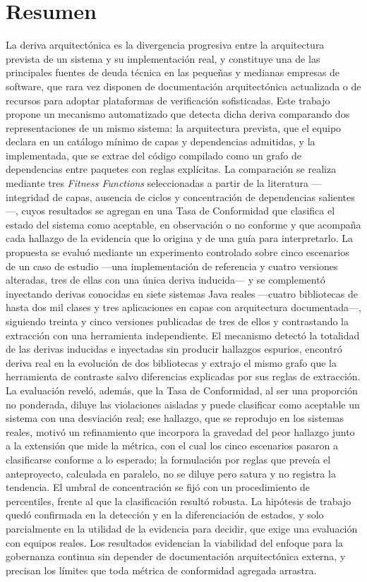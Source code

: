 
\chapter*{Resumen}
La deriva arquitectónica es la divergencia progresiva entre la arquitectura prevista de un sistema y su implementación real, y constituye una de las principales fuentes de deuda técnica en las pequeñas y medianas empresas de software, que rara vez disponen de documentación arquitectónica actualizada o de recursos para adoptar plataformas de verificación sofisticadas. Este trabajo propone un mecanismo automatizado que detecta dicha deriva comparando dos representaciones de un mismo sistema: la arquitectura prevista, que el equipo declara en un catálogo mínimo de capas y dependencias admitidas, y la implementada, que se extrae del código compilado como un grafo de dependencias entre paquetes con reglas explícitas. La comparación se realiza mediante tres \textit{Fitness Functions} seleccionadas a partir de la literatura ---integridad de capas, ausencia de ciclos y concentración de dependencias salientes---, cuyos resultados se agregan en una Tasa de Conformidad que clasifica el estado del sistema como aceptable, en observación o no conforme y que acompaña cada hallazgo de la evidencia que lo origina y de una guía para interpretarlo. La propuesta se evaluó mediante un experimento controlado sobre cinco escenarios de un caso de estudio ---una implementación de referencia y cuatro versiones alteradas, tres de ellas con una única deriva inducida--- y se complementó inyectando derivas conocidas en siete sistemas Java reales ---cuatro bibliotecas de hasta dos mil clases y tres aplicaciones en capas con arquitectura documentada---, siguiendo treinta y cinco versiones publicadas de tres de ellos y contrastando la extracción con una herramienta independiente. El mecanismo detectó la totalidad de las derivas inducidas e inyectadas sin producir hallazgos espurios, encontró deriva real en la evolución de dos bibliotecas y extrajo el mismo grafo que la herramienta de contraste salvo diferencias explicadas por sus reglas de extracción. La evaluación reveló, además, que la Tasa de Conformidad, al ser una proporción no ponderada, diluye las violaciones aisladas y puede clasificar como aceptable un sistema con una desviación real; ese hallazgo, que se reprodujo en los sistemas reales, motivó un refinamiento que incorpora la gravedad del peor hallazgo junto a la extensión que mide la métrica, con el cual los cinco escenarios pasaron a clasificarse conforme a lo esperado; la formulación por reglas que preveía el anteproyecto, calculada en paralelo, no se diluye pero satura y no registra la tendencia. El umbral de concentración se fijó con un procedimiento de percentiles, frente al que la clasificación resultó robusta. La hipótesis de trabajo quedó confirmada en la detección y en la diferenciación de estados, y solo parcialmente en la utilidad de la evidencia para decidir, que exige una evaluación con equipos reales. Los resultados evidencian la viabilidad del enfoque para la gobernanza continua sin depender de documentación arquitectónica externa, y precisan los límites que toda métrica de conformidad agregada arrastra.

